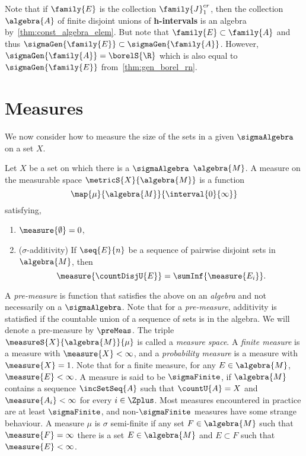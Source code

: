 \begin{Remark}\label{rmk:hinterval}
    Note that if $\family{E}$ is the collection $\family{J}^{cr}_{1}$, then the collection
    $\algebra{A}$ of finite disjoint unions of \textbf{h-intervals} is an algebra
    by~\ref{thm:const_algebra_elem}. But note that $\family{E} \subset \family{A}$ and thus
    $\sigmaGen{\family{E}} \subset \sigmaGen{\family{A}}$. However, 
    $\sigmaGen{\family{A}} = \borelS{\R}$ which is also equal to $\sigmaGen{\family{E}}$
    from~\ref{thm:gen_borel_rn}.
\end{Remark}

\section{Measures}
We now consider how to measure the size of the sets in a given $\sigmaAlgebra$ on a set $X$.
\begin{Definition}[name=Measure]
    Let $X$ be a set on which there is a $\sigmaAlgebra$ $\algebra{M}$. A measure on the measurable
    space $\metricS{X}{\algebra{M}}$ is a function \[\map{\mu}{\algebra{M}}{\interval{0}{\infty}}\]
    satisfying,
    \begin{enumerate}
	\item
	    $\measure{\emptyset} = 0$,
	\item
	    ($\sigma$-additivity) If $\seq{E}{n}$ be a sequence of pairwise disjoint sets in 
	    $\algebra{M}$, then
	    \begin{equation*}
		\measure{\countDisjU{E}} = \sumInf{\measure{E_i}}.
	    \end{equation*}
    \end{enumerate}
\end{Definition}
A \emph{pre-measure} is function that satisfies the above on an \emph{algebra} and not necessarily
on a $\sigmaAlgebra$. Note that for a \emph{pre-measure}, additivity is statisfied if the countable
union of a sequence of sets is in the algebra. We will denote a pre-measure by $\preMeas$. 
The triple $\measureS{X}{\algebra{M}}{\mu}$ is called a \emph{measure space}.
A \emph{finite measure} is a measure with $\measure{X} < \infty$, and a \emph{probability measure}
is a measure with $\measure{X} = 1$. Note that for a finite measure, for any $E \in \algebra{M}$,
$\measure{E} < \infty$. A measure is said to be $\sigmaFinite$, if $\algebra{M}$
contains a sequence $\incSetSeq{A}$ such that $\countU{A} = X$ and $\measure{A_i} < \infty$ for
every $i \in \Zplus$. Most measures encountered in practice are at least $\sigmaFinite$, and
non-$\sigmaFinite$ measures have some strange behaviour. A measure $\mu$ is $\sigma$ semi-finite if
any set $F \in \algebra{M}$ such that $\measure{F} = \infty$ there is a set $E \in \algebra{M}$ and
$E \subset F$ such that $\measure{E} < \infty$.

